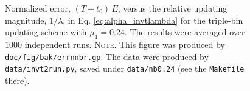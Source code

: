 \documentclass[preprint, floatfix]{revtex4-1}
\newcommand{\note}[1]{{\color{DarkGreen}\footnotesize \textsc{Note.} #1}}
\begin{document}


\begin{figure}[h]
\begin{center}
  \caption{
    \label{fig:errnnbr}
    Normalized error, $(T + t_0) \, E$,
    versus the %
    relative updating magnitude,
    $1/\lambda$,
    in Eq. \eqref{eq:alpha_invtlambda}
    for the triple-bin updating scheme with $\mu_1 = 0.24$.
    The results were averaged over $1000$ independent runs.
    \note{This figure was produced by \texttt{doc/fig/bak/errnnbr.gp}.
      The data were produced by \texttt{data/invt2run.py},
      saved under \texttt{data/nb0.24}
      (see the \texttt{Makefile} there).
    }%
  }
\end{center}
\end{figure}
\end{document}

